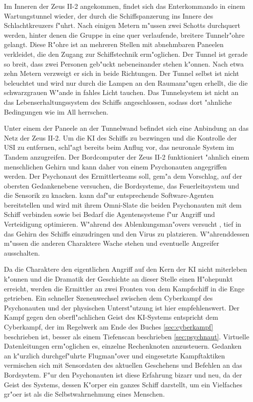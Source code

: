Im Inneren der Zeus II-2 angekommen, findet sich das Enterkommando in einem Wartungstunnel wieder, der durch die Schiffspanzerung ins Innere des Schlachtkreuzers f"uhrt. Nach einigen Metern m"ussen zwei Schotts durchquert werden, hinter denen die Gruppe in eine quer verlaufende, breitere Tunnelr"ohre gelangt. Diese R"ohre ist an mehreren Stellen mit abnehmbaren Paneelen verkleidet, die den Zugang zur Schiffstechnik erm"oglichen. Der Tunnel ist gerade so breit, dass zwei Personen geb"uckt nebeneinander stehen k"onnen. Nach etwa zehn Metern verzweigt er sich in beide Richtungen. Der Tunnel selbst ist nicht beleuchtet und wird nur durch die Lampen an den Raumanz"ugen erhellt, die die schwarzgrauen W"ande in fahles Licht tauchen. Das Tunnelsystem ist nicht an das Lebenserhaltungssystem des Schiffs angeschlossen, sodass dort "ahnliche Bedingungen wie im All herrschen.

Unter einem der Paneele an der Tunnelwand befindet sich eine Anbindung an das Netz der Zeus II-2. Um die KI des Schiffs zu bezwingen und die Kontrolle der USI zu entfernen, schl"agt \xl{} bereits beim Anflug vor, das neuronale System im Tandem anzugreifen. Der Bordcomputer der Zeus II-2 funktioniert "ahnlich einem menschlichen Gehirn und kann daher von einem Psychonauten angegriffen werden. Der Psychonaut des Ermittlerteams soll, gem"a\3 dem Vorschlag, auf der obersten Gedankenebene versuchen, die Bordsysteme, das Feuerleitsystem und die Sensorik zu knacken. \ml{} kann daf"ur entsprechende Software-Agenten bereitstellen und wird mit ihrem Omni-Slate die beiden Psychonauten mit dem Schiff verbinden sowie bei Bedarf die Agentensysteme f"ur Angriff und Verteidigung optimieren. W"ahrend des Ablenkungsman"overs versucht \xl{}, tief in das Gehirn des Schiffs einzudringen und den Virus zu platzieren. W"ahrenddessen m"ussen die anderen Charaktere Wache stehen und eventuelle Angreifer ausschalten.

Da die Charaktere den eigentlichen Angriff auf den Kern der KI nicht miterleben k"onnen und die Dramatik der Geschichte an dieser Stelle einen H"ohepunkt erreicht, werden die Ermittler an zwei Fronten von dem Kampfschiff in die Enge getrieben. Ein schneller Szenenwechsel zwischen dem Cyberkampf des Psychonauten und der physischen Unterst"utzung ist hier empfehlenswert. Der Kampf gegen den oberfl"achlichen Geist des KI-Systems entspricht dem Cyberkampf, der im Regelwerk am Ende des Buches \cref{sec:cyberkampf} beschrieben ist, besser als einem Tiefenscan beschrieben \cref{sec:psychnaut}. Virtuelle Datenleitungen erm"oglichen es, einzelne Rechenknoten anzusteuern. Gedanken an k"urzlich durchgef"uhrte Flugman"over und eingesetzte Kampftaktiken vermischen sich mit Sensordaten des aktuellen Geschehens und Befehlen an das Bordsystem. F"ur den Psychonauten ist diese Erfahrung bizarr und neu, da der Geist des Systems, dessen K"orper ein ganzes Schiff darstellt, um ein Vielfaches gr"o\3er ist als die Selbstwahrnehmung eines Menschen.

